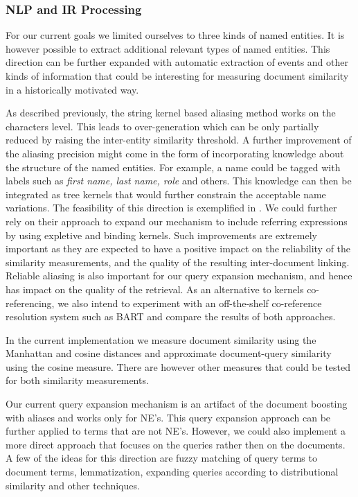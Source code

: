 \subsubsection{NLP and IR Processing}
\label{sec:future_work_NLP}
For our current goals we limited ourselves to three kinds of named entities. 
It is however possible to extract additional relevant types of named entities. 
This direction can be further expanded with automatic extraction of events and other kinds of information that could be interesting for measuring 
document similarity in a historically motivated way.  

As described previously, the string kernel based aliasing method works on the characters level. 
This leads to over-generation which can be only partially reduced by raising the inter-entity similarity threshold.   
A further improvement of the aliasing precision might come in the form of incorporating knowledge about the structure of the named entities. 
For example, a name could be tagged
with labels such as \emph{first name, last name, role} and others. This knowledge can then be integrated as tree kernels
that would further constrain the acceptable name variations. The feasibility of this direction is exemplified in \cite{string_kernel_coref}.
We could further rely on their approach to expand our mechanism to include referring expressions by using expletive and binding kernels.
Such improvements are extremely important as they are expected to have a positive impact on the reliability of the similarity measurements, and
the quality of the resulting inter-document linking. 
Reliable aliasing is also important for our query expansion mechanism, and hence has impact on the quality of the retrieval.
As an alternative to kernels co-referencing, we also intend to experiment with an off-the-shelf co-reference resolution system such as 
BART and compare the results of both approaches. 

In the current implementation we measure document similarity using the Manhattan and cosine distances and approximate document-query similarity 
using the cosine measure. There are however other measures that could be tested for both similarity measurements. 

Our current query expansion mechanism is an artifact of the document boosting with aliases and works only for NE's. This query expansion approach can be further applied to terms that are not NE's. However, we could also implement a more direct approach that focuses on the queries rather then on the documents. A few of the ideas for this direction are fuzzy matching of query terms to document terms, lemmatization, expanding queries according to distributional similarity and other techniques. 



